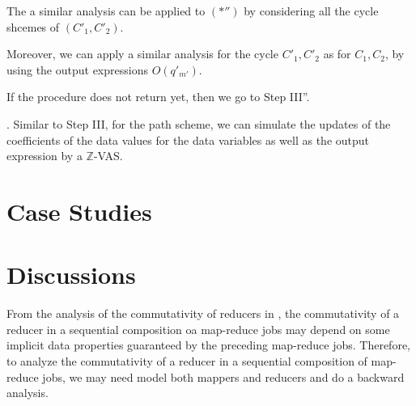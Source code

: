 \documentclass[runningheads,a4paper]{llncs}
\newcommand\intnum{{\mathbb{Z} }}
\begin{document}
The a similar analysis can be applied to $(\ast'')$ by considering all the cycle shcemes of $(C'_1,C'_2)$.

Moreover, we can apply a similar analysis for the cycle $C'_1,C'_2$ as for $C_1,C_2$, by using the output expressions $O(q'_{m'})$.

If the procedure does not return yet, then we go to Step III''.

\smallskip

. Similar to Step III, for the path scheme, we can simulate the updates of the coefficients of the data values for the data variables as well as the output expression by a $\intnum$-VAS.

\section{Case Studies}
\section{Discussions}

From the analysis of the commutativity of reducers in \cite{XZZ+14}, the commutativity of a reducer in a sequential composition oa map-reduce jobs may depend on some implicit data properties guaranteed by the preceding map-reduce jobs. Therefore, to analyze the commutativity of a reducer in a sequential composition of map-reduce jobs, we may need model both mappers and reducers and do a backward analysis.





\begin{appendix}



\end{appendix}
\end{document}
